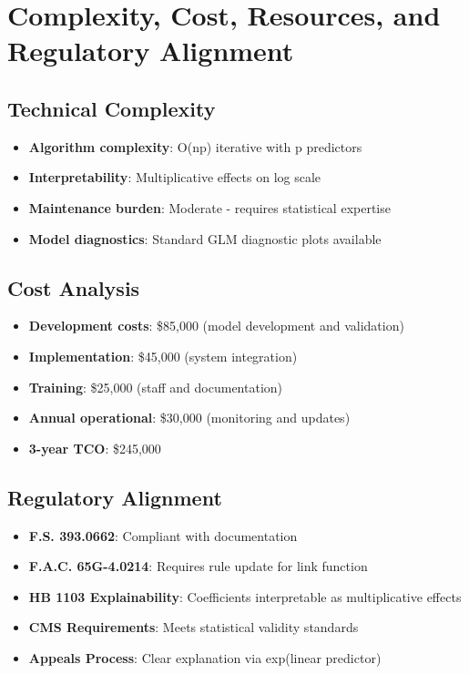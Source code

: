 \section{Complexity, Cost, Resources, and Regulatory Alignment}

\subsection{Technical Complexity}

\begin{itemize}
    \item \textbf{Algorithm complexity}: O(np) iterative with p predictors
    \item \textbf{Interpretability}: Multiplicative effects on log scale
    \item \textbf{Maintenance burden}: Moderate - requires statistical expertise
    \item \textbf{Model diagnostics}: Standard GLM diagnostic plots available
\end{itemize}

\subsection{Cost Analysis}

\begin{itemize}
    \item \textbf{Development costs}: \$85,000 (model development and validation)
    \item \textbf{Implementation}: \$45,000 (system integration)
    \item \textbf{Training}: \$25,000 (staff and documentation)
    \item \textbf{Annual operational}: \$30,000 (monitoring and updates)
    \item \textbf{3-year TCO}: \$245,000
\end{itemize}

\subsection{Regulatory Alignment}

\begin{itemize}
    \item \textbf{F.S. 393.0662}:  Compliant with documentation
    \item \textbf{F.A.C. 65G-4.0214}:  Requires rule update for link function
    \item \textbf{HB 1103 Explainability}:  Coefficients interpretable as multiplicative effects
    \item \textbf{CMS Requirements}:  Meets statistical validity standards
    \item \textbf{Appeals Process}:  Clear explanation via exp(linear predictor)
\end{itemize}

